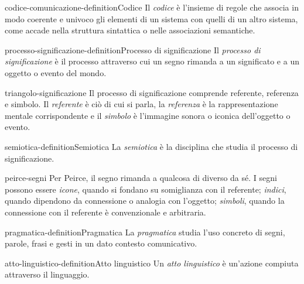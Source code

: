 \documentclass[preview]{standalone}
\begin{document}
\begin{snippetdefinition}{codice-comunicazione-definition}{Codice}
    Il \emph{codice} è l'insieme di regole che associa in modo coerente e
    univoco gli elementi di un sistema con quelli di un altro sistema, come
    accade nella struttura sintattica o nelle associazioni semantiche.
\end{snippetdefinition}

\begin{snippetdefinition}{processo-significazione-definition}{Processo di significazione}
    Il \emph{processo di significazione} è il processo attraverso cui un segno
    rimanda a un significato e a un oggetto o evento del mondo.
\end{snippetdefinition}

\begin{snippet}{triangolo-significazione}
    Il processo di significazione comprende referente, referenza e simbolo. Il
    \emph{referente} è ciò di cui si parla, la \emph{referenza} è la
    rappresentazione mentale corrispondente e il \emph{simbolo} è l'immagine
    sonora o iconica dell'oggetto o evento.
\end{snippet}


\begin{snippetdefinition}{semiotica-definition}{Semiotica}
    La \emph{semiotica} è la disciplina che studia il processo di significazione.
\end{snippetdefinition}

\begin{snippet}{peirce-segni}
    Per Peirce, il segno rimanda a qualcosa di diverso da sé. I segni possono
    essere \emph{icone}, quando si fondano su somiglianza con il referente;
    \emph{indici}, quando dipendono da connessione o analogia con l'oggetto;
    \emph{simboli}, quando la connessione con il referente è convenzionale e
    arbitraria.
\end{snippet}

\begin{snippetdefinition}{pragmatica-definition}{Pragmatica}
    La \emph{pragmatica} studia l'uso concreto di segni, parole, frasi e gesti
    in un dato contesto comunicativo.
\end{snippetdefinition}

\begin{snippetdefinition}{atto-linguistico-definition}{Atto linguistico}
    Un \emph{atto linguistico} è un'azione compiuta attraverso il linguaggio.
\end{snippetdefinition}
\end{document}
